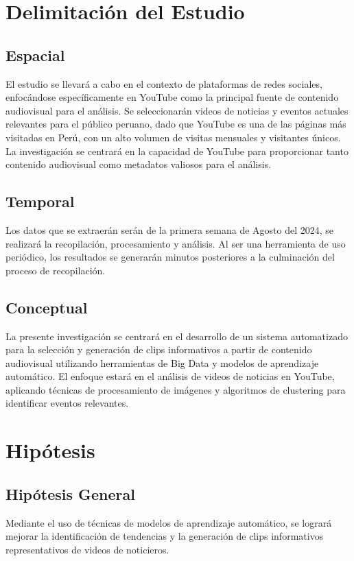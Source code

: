 \section{Delimitación del Estudio}

\subsection{Espacial}
El estudio se llevará a cabo en el contexto de plataformas de redes sociales, enfocándose específicamente en YouTube como la principal fuente de contenido audiovisual para el análisis. Se seleccionarán videos de noticias y eventos actuales relevantes para el público peruano, dado que YouTube es una de las páginas más visitadas en Perú, con un alto volumen de visitas mensuales y visitantes únicos. La investigación se centrará en la capacidad de YouTube para proporcionar tanto contenido audiovisual como metadatos valiosos para el análisis.
\subsection{Temporal}
Los datos que se extraerán serán de la primera semana de Agosto del 2024, se realizará la recopilación, procesamiento y análisis. Al ser una herramienta de uso periódico, los resultados se generarán minutos posteriores a la culminación del proceso de recopilación.
\subsection{Conceptual}
La presente investigación se centrará en el desarrollo de un sistema automatizado para la selección y generación de clips informativos a partir de contenido audiovisual utilizando herramientas de Big Data y modelos de aprendizaje automático. El enfoque estará en el análisis de videos de noticias en YouTube, aplicando técnicas de procesamiento de imágenes y algoritmos de clustering para identificar eventos relevantes.
\section{Hipótesis}

\subsection{Hipótesis General}
\newcommand{\HipotesisGeneral}{
	Mediante el uso de técnicas de modelos de aprendizaje automático, se logrará mejorar la identificación de tendencias y la generación de clips informativos representativos de videos de noticieros.
}
\HipotesisGeneral

